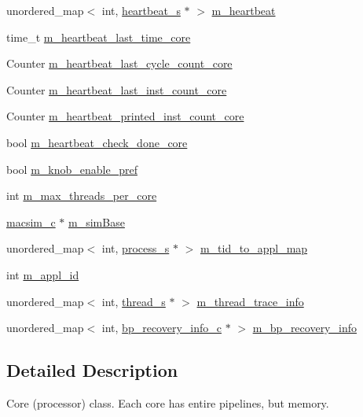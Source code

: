 \begin{DoxyCompactItemize}
\item 
unordered\_\-map$<$ int, \hyperlink{classheartbeat__s}{heartbeat\_\-s} $\ast$ $>$ \hyperlink{classcore__c_a2df8391575050b987e43bd1d4e3a3308}{m\_\-heartbeat}
\item 
time\_\-t \hyperlink{classcore__c_ac39e45112af1b8690321132caf0c6aec}{m\_\-heartbeat\_\-last\_\-time\_\-core}
\item 
Counter \hyperlink{classcore__c_a3f04f1619a29cfc03525aa63f958a3c7}{m\_\-heartbeat\_\-last\_\-cycle\_\-count\_\-core}
\item 
Counter \hyperlink{classcore__c_a9b56be75f1ec5fa4113f2412d73d5717}{m\_\-heartbeat\_\-last\_\-inst\_\-count\_\-core}
\item 
Counter \hyperlink{classcore__c_a12d8fee9e07c3fb12f18ef862d66c529}{m\_\-heartbeat\_\-printed\_\-inst\_\-count\_\-core}
\item 
bool \hyperlink{classcore__c_ab05dd1f0dc2730e1efc46c7ee2288aee}{m\_\-heartbeat\_\-check\_\-done\_\-core}
\item 
bool \hyperlink{classcore__c_a8f3b1efc800f1e8967c8e406562069e3}{m\_\-knob\_\-enable\_\-pref}
\item 
int \hyperlink{classcore__c_af42a23fef776aaac11781e717aabc26d}{m\_\-max\_\-threads\_\-per\_\-core}
\item 
\hyperlink{classmacsim__c}{macsim\_\-c} $\ast$ \hyperlink{classcore__c_a4bf560c9e3054151af77be43d8303134}{m\_\-simBase}
\item 
unordered\_\-map$<$ int, \hyperlink{structprocess__s}{process\_\-s} $\ast$ $>$ \hyperlink{classcore__c_ae779882c44efa9eab03a16bba514805f}{m\_\-tid\_\-to\_\-appl\_\-map}
\item 
int \hyperlink{classcore__c_a957210a01132d2371fdff5eb64daca0f}{m\_\-appl\_\-id}
\item 
unordered\_\-map$<$ int, \hyperlink{structthread__s}{thread\_\-s} $\ast$ $>$ \hyperlink{classcore__c_a83a3dc71ffb0f30eee3c142e2a0799af}{m\_\-thread\_\-trace\_\-info}
\item 
unordered\_\-map$<$ int, \hyperlink{classbp__recovery__info__c}{bp\_\-recovery\_\-info\_\-c} $\ast$ $>$ \hyperlink{classcore__c_a6f33ae7ae833c7c78596c4461cd39684}{m\_\-bp\_\-recovery\_\-info}
\end{DoxyCompactItemize}


\subsection{Detailed Description}
Core (processor) class. Each core has entire pipelines, but memory. 

